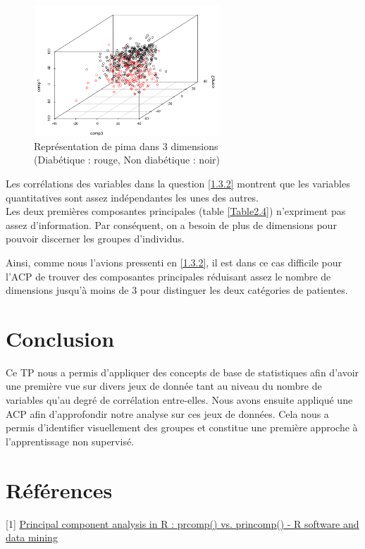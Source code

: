 \documentclass{article}
\begin{document}
\begin{figure}[H]
\centering
\includegraphics[width=7cm]{./img/acp_pima_3d.png}
\caption{Représentation de pima dans 3 dimensions\\ (Diabétique : rouge, Non diabétique : noir)}
\label{acp_pima_3d}
\end{figure}

Les corrélations des variables dans la question \ref{1.3.2} montrent que les variables quantitatives sont assez indépendantes les unes des autres.\\
Les deux premières composantes principales (table \ref{Table2.4}) n'expriment pas assez d'information. Par conséquent, on a besoin de plus de dimensions pour pouvoir discerner les groupes d'individus.

Ainsi, comme nous l'avions pressenti en \ref{1.3.2}, il est dans ce cas difficile pour l'ACP de trouver des composantes principales réduisant assez le nombre de dimensions jusqu'à moins de 3 pour distinguer les deux catégories de patientes.

\section*{Conclusion}

Ce TP nous a permis d'appliquer des concepts de base de statistiques afin d'avoir une première vue sur divers jeux de donnée tant au niveau du nombre de variables qu'au degré de corrélation entre-elles. Nous avons ensuite appliqué une ACP afin d'approfondir notre analyse sur ces jeux de données. Cela nous a permis d'identifier visuellement des groupes et constitue une première approche à l'apprentissage non supervisé.  


\section*{Références}
[1] \href{http://www.sthda.com/english/wiki/principal-component-analysis-in-r-prcomp-vs-princomp-r-software-and-data-mining}{Principal component analysis in R : prcomp() vs. princomp() - R software and data mining}
\end{document}
